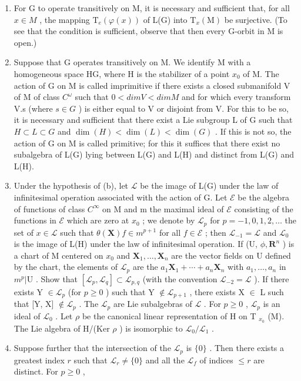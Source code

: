 \begin{enumerate}
\def\labelenumi{(\alph{enumi})}
\item
  For G to operate transitively on M, it is necessary and sufficient that, for all \(x \in M\) , the mapping \(\mathrm{T}_{e}(\varphi(x))\) of L(G) into \(\mathrm{T}_{x}(\mathrm{M})\) be surjective. (To see that the condition is sufficient, observe that then every G-orbit in M is open.)
\item
  Suppose that G operates transitively on M. We identify M with a homogeneous space H\textbar G, where H is the stabilizer of a point \(x_{0}\) of M. The action of G on M is called imprimitive if there exists a closed submanifold V of M of class \(C^{\omega}\) such that \(0 < dim V < dim M\) and for which every transform V.s (where \(s \in G\) ) is either equal to V or disjoint from V. For this to be so, it is necessary and sufficient that there exist a Lie subgroup L of G such that \(H \subset L \subset G\) and \(\dim(H) < \dim(L) < \dim(G)\) . If this is not so, the action of G on M is called primitive; for this it suffices that there exist no subalgebra of L(G) lying between L(G) and L(H) and distinct from L(G) and L(H).
\item
  Under the hypothesis of (b), let \(\mathcal{L}\) be the image of L(G) under the law of infinitesimal operation associated with the action of G. Let \(\mathcal{E}\) be the algebra of functions of class \(C^\infty\) on M and m the maximal ideal of \(\mathcal{E}\) consisting of the functions in \(\mathcal{E}\) which are zero at \(x_0\) ; we denote by \(\mathcal{L}_p\) for \(p = -1, 0, 1, 2, \ldots\) the set of \(x \in \mathcal{L}\) such that \(\theta(\mathbf{X}) f \in m^{p+1}\) for all \(f \in \mathcal{E}\) ; then \(\mathcal{L}_{-1} = \mathcal{L}\) and \(\mathcal{L}_0\) is the image of L(H) under the law of infinitesimal operation. If (U, \(\phi, \mathbf{R}^n\) ) is a chart of M centered on \(x_0\) and \(\mathbf{X}_1, \ldots, \mathbf{X}_n\) are the vector fields on U defined by the chart, the elements of \(\mathcal{L}_p\) are the \(a_1\mathbf{X}_1 + \cdots + a_n\mathbf{X}_n\) with \(a_1, \ldots, a_n\) in \(m^p|\text{U}\) . Show that \([\mathcal{L}_p, \mathcal{L}_q] \subset \mathcal{L}_{p,q}\) (with the convention \(\mathcal{L}_{-2} = \mathcal{L}\) ). If there exists Y \(\in \mathcal{L}_p\) (for \(p \geqslant 0\) ) such that Y \(\notin \mathcal{L}_{p+1}\) , there exists X \(\in\) L such that {[}Y, X{]} \(\notin \mathcal{L}_p\) . The \(\mathcal{L}_p\) are Lie subalgebras of \(\mathcal{L}\) . For \(p \geqslant 0\) , \(\mathcal{L}_p\) is an ideal of \(\mathcal{L}_0\) . Let \(\rho\) be the canonical linear representation of H on T \(_{x_0}\) (M). The Lie algebra of H/(Ker \(\rho\) ) is isomorphic to \(\mathcal{L}_0/\mathcal{L}_1\) .
\item
  Suppose further that the intersection of the \(\mathcal{L}_p\) is \(\{0\}\) . Then there exists a greatest index \(r\) such that \(\mathcal{L}_r \neq \{0\}\) and all the \(\mathcal{L}_f\) of indices \(\leqslant r\) are distinct. For \(p \geqslant 0\) ,
\end{enumerate}

